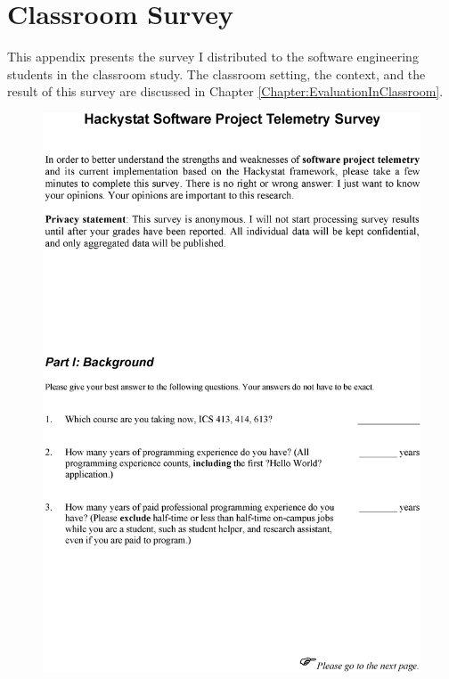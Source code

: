 \chapter{Classroom Survey}
\label{Appendix:EvaluationInClassroom}

This appendix presents the survey I distributed to the software engineering students in the classroom study. The classroom setting, the context, and the result of this survey are discussed in Chapter \ref{Chapter:EvaluationInClassroom}.

\clearpage

\begin{figure}[p]
  \includegraphics[height=1.00\textheight]{figures/ClassroomSurveyPage1}
\end{figure}

